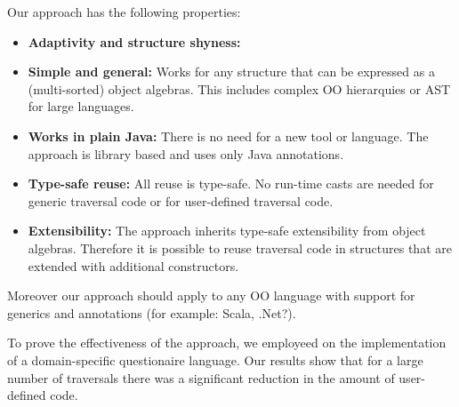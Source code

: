 Our approach has the following properties:

\begin{itemize}

\item {\bf Adaptivity and structure shyness:}

\item {\bf Simple and general:} Works for any structure that can be expressed 
as a (multi-sorted) object algebras. This includes complex OO hierarquies
or AST for large languages. 

\item {\bf Works in plain Java:} There is no need for a new tool or language. 
The approach is library based and uses only Java annotations. 

\item {\bf Type-safe reuse:}   All reuse is type-safe. No run-time
  casts are needed for generic traversal code or for user-defined 
  traversal code. 

\item {\bf Extensibility:} The approach inherits type-safe
  extensibility from object algebras. Therefore it is possible to
  reuse traversal code in structures that are extended with additional
  constructors.

\end{itemize}

Moreover our approach should apply to any OO language with support 
for generics and annotations (for example: Scala, .Net?).

To prove the effectiveness of the approach, we employeed \name 
on the implementation of a domain-specific questionaire 
language. Our results show that for a large number of traversals 
there was a significant reduction in the amount of user-defined code.

